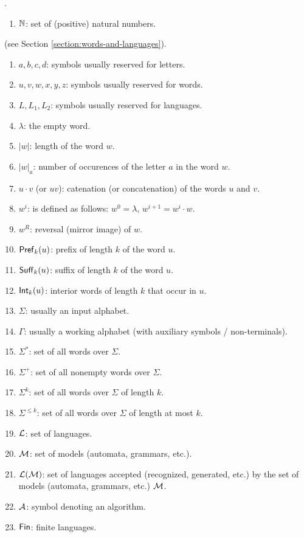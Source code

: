 
.

\begin{enumerate}[]
\item $\mathbb{N}$: set of (positive) natural numbers.
\end{enumerate}

 (see Section \ref{section:words-and-languages}).

\begin{enumerate}[]
\item $a, b, c, d$: symbols usually reserved for letters.
\item $u, v, w, x, y, z$: symbols usually reserved for words.
\item $L, L_1, L_2$: symbols usually reserved for languages.
\item $\lambda$: the empty word.
\item $|w|$: length of the word $w$.
\item $|w|_a$: number of occurences of the letter $a$ in the word $w$.
\item $u \cdot v$ (or $uv$): catenation (or concatenation) of the words $u$ and $v$.
\item $w^i$: is defined as follows: $w^0 = \lambda$, $w^{i+1} = w^i \cdot w$.
\item $w^R$: reversal (mirror image) of $w$.
\item $\textup{\sf Pref\/}_k(u)$: prefix of length $k$ of the word $u$.
\item $\textup{\sf Suff\/}_k(u)$: suffix of length $k$ of the word $u$.
\item $\textup{\sf Int\/}_k(u)$: interior words of length $k$ that occur in $u$.
\item $\Sigma$: usually an input alphabet.
\item $\Gamma$: usually a working alphabet (with auxiliary symbols / non-terminals).
\item $\Sigma^*$: set of all words over $\Sigma$.
\item $\Sigma^+$: set of all nonempty words over $\Sigma$.
\item $\Sigma^k$: set of all words over $\Sigma$ of length $k$.
\item $\Sigma^{\le k}$: set of all words over $\Sigma$ of length at most $k$.
\item $\textup{\sf $\mathcal{L}$}$: set of languages.
\item $\textup{\sf $\mathcal{M}$}$: set of models (automata, grammars, etc.).
\item ${\cal L}(\textup{\sf $\mathcal{M}$})$: set of languages accepted (recognized, generated, etc.) by the set of models (automata, grammars, etc.) $\textup{\sf $\mathcal{M}$}$.
\item $\textup{\sf $\mathcal{A}$}$: symbol denoting an algorithm.
\item $\textup{\sf Fin}$: finite languages.
\end{enumerate}

